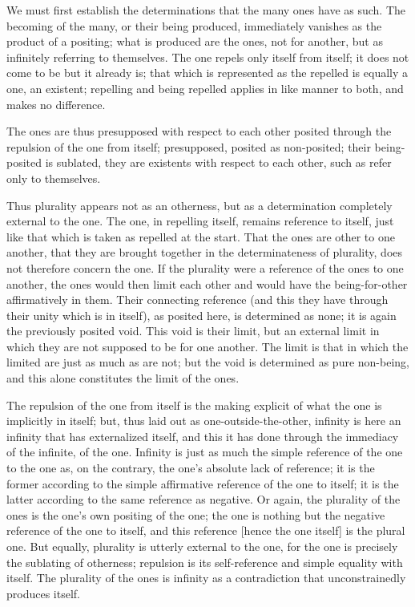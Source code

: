 We must first establish the determinations
that the many ones have as such.
The becoming of the many, or their being produced,
immediately vanishes as the product of a positing;
what is produced are the ones, not for another,
but as infinitely referring to themselves.
The one repels only itself from itself;
it does not come to be but it already is;
that which is represented as the repelled is
equally a one, an existent;
repelling and being repelled applies
in like manner to both, and makes no difference.

The ones are thus presupposed
with respect to each other posited through
the repulsion of the one from itself;
presupposed, posited as non-posited;
their being-posited is sublated,
they are existents with respect to each other,
such as refer only to themselves.

Thus plurality appears not as an otherness,
but as a determination completely external to the one.
The one, in repelling itself, remains reference to itself,
just like that which is taken as repelled at the start.
That the ones are other to one another,
that they are brought together in
the determinateness of plurality,
does not therefore concern the one.
If the plurality were a
reference of the ones to one another,
the ones would then limit each other
and would have the being-for-other affirmatively in them.
Their connecting reference
(and this they have through their unity which is in itself),
as posited here, is determined as none;
it is again the previously posited void.
This void is their limit,
but an external limit in which
they are not supposed to be for one another.
The limit is that in which
the limited are just as much as are not;
but the void is determined as pure non-being,
and this alone constitutes the limit of the ones.

The repulsion of the one from itself is
the making explicit of what
the one is implicitly in itself;
but, thus laid out as one-outside-the-other,
infinity is here an infinity that has externalized itself,
and this it has done through the immediacy
of the infinite, of the one.
Infinity is just as much
the simple reference of the one to the one
as, on the contrary, the one's absolute lack of reference;
it is the former according to the simple affirmative reference
of the one to itself;
it is the latter according to the same reference as negative.
Or again, the plurality of the ones is
the one's own positing of the one;
the one is nothing but
the negative reference of the one to itself,
and this reference
[hence the one itself]
is the plural one.
But equally, plurality is utterly external to the one,
for the one is precisely the sublating of otherness;
repulsion is its self-reference and simple equality with itself.
The plurality of the ones is infinity as a contradiction
that unconstrainedly produces itself.


